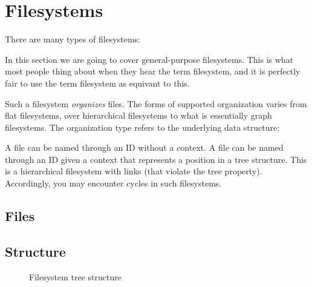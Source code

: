 

\section{Filesystems}

There are many types of filesystems:
\begin{itemize}
\end{itemize}

In this section we are going to cover general-purpose filesystems. This is what most people thing about when they hear the term filesystem, and it is perfectly fair to use the term filesystem as equivant to this.

Such a filesystem \textsl{organizes} files. The forms of supported organization varies from flat filesystems, over hierarchical filesystems to what is essentially graph filesystems. The organization type refers to the underlying data structure:
\begin{itemize}
   A file can be named through an ID without a context.
   A file can be named through an ID given a context that represents a position in a tree structure.
   This is a hierarchical filesystem with links (that violate the tree property). Accordingly, you may encounter cycles in such filesystems.
\end{itemize}

\subsection{Files}



\subsection{Structure}


\begin{figure}[tbp]
  \begin{center}
  \end{center}
  \caption{Filesystem tree structure}
  \label{fig:topics:fs:dir}
\end{figure}


